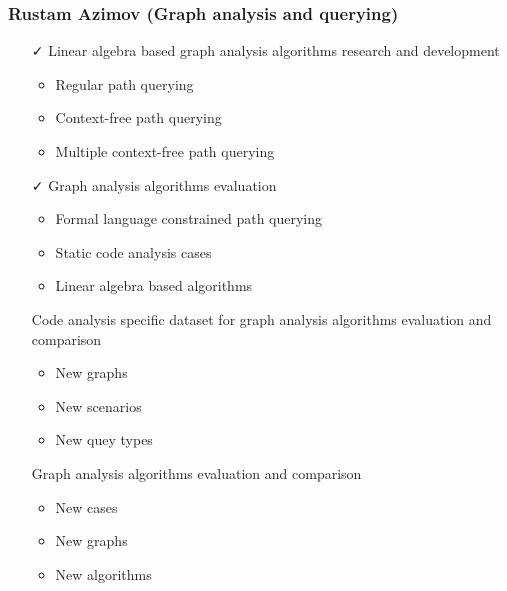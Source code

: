 \documentclass[xcolor=table,aspectratio=169]{beamer}
\begin{document}
\begin{frame}[fragile]
  \frametitle{Rustam Azimov (Graph analysis and querying)}
  \begin{minipage}[t]{0.48\textwidth}
    \begin{itemize}
      \item[\faCheck] Linear algebra based graph analysis algorithms research and development 
      \begin{itemize}
        \item Regular path querying
        \item Context-free path querying
        \item Multiple context-free path querying
      \end{itemize}      
      \item[\faCheck] Graph analysis algorithms evaluation
      \begin{itemize}
        \item Formal language constrained path querying
        \item Static code analysis cases
        \item Linear algebra based algorithms
      \end{itemize}      
    \end{itemize}
  \end{minipage}
  \pause
  \begin{minipage}[t]{0.48\textwidth}
    \begin{itemize}
      \item[\faHourglassHalf] Code analysis specific dataset for graph analysis algorithms evaluation and comparison
      \begin{itemize}
        \item New graphs
        \item New scenarios
        \item New quey types
      \end{itemize}      
      \item[\faHourglassHalf] Graph analysis algorithms evaluation and comparison
      \begin{itemize}
        \item New cases
        \item New graphs
        \item New algorithms
      \end{itemize}      
    \end{itemize}
  \end{minipage}
\end{frame}
\end{document}
